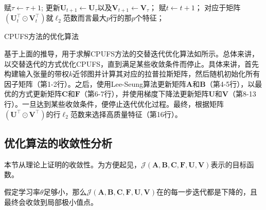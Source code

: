 \begin{algorithm}[t]
\begin{algorithmic}[1]
    \STATE 赋$\tau\leftarrow\tau+1$;
    \ENDWHILE
    \STATE 更新$\boldsymbol{U}_{t+1}\leftarrow\boldsymbol{U}_{\tau}$以及$\boldsymbol{V}_{t+1}\leftarrow\boldsymbol{V}_{\tau}$；
    \STATE 赋$t\leftarrow t+1$；
    \ENDWHILE
    \RETURN 对应于矩阵$(\boldsymbol{U}_{t}^{\top}\odot\boldsymbol{V}_{t}^{\top})$就$\ell_{2}$范数而言最大$p$行的那$p$个特征；
    \end{algorithmic}
    \captionsetup{labelsep=period,font=bf}
    \caption{CPUFS方法的优化算法}
    \label{alg:cpufs}
\end{algorithm}
    
基于上面的推导，用于求解CPUFS方法的交替迭代优化算法如所示。总体来讲，以交替迭代的方式优化CPUFS，直到满足某些收敛条件而停止。具体来讲，首先构建输入张量的带权$k$近邻图并计算其对应的拉普拉斯矩阵，然后随机初始化所有因子矩阵（第1-2行）。之后，使用Lee-Seung算法更新矩阵$\boldsymbol{A}$和$\boldsymbol{B}$（第4-5行），以最优的方式更新矩阵$\boldsymbol{C}$和$\boldsymbol{F}$（第6-7行），并使用梯度下降法更新矩阵$\boldsymbol{U}$和$\boldsymbol{V}$（第8-13行）。一旦达到某些收敛条件，便停止迭代优化过程。最终，根据矩阵$(\boldsymbol{U}^{\top}\odot\boldsymbol{V}^{\top})$的行$\ell_{2}$范数来选择高质量特征（第16行）。

\subsection{优化算法的收敛性分析}

本节从理论上证明的收敛性。为方便起见，$\mathcal{J}(\boldsymbol{A},\boldsymbol{B},\allowbreak\boldsymbol{C},\boldsymbol{F},\boldsymbol{U},\boldsymbol{V})$表示的目标函数。

\begin{theorem}\label{thm:conv}\kaishu
假定学习率$\theta$足够小，那么$\mathcal{J}(\boldsymbol{A},\boldsymbol{B},\boldsymbol{C},\boldsymbol{F},\boldsymbol{U},\boldsymbol{V})$在的每一步迭代都是下降的，且最终会收敛到局部极小值点。
\end{theorem}

